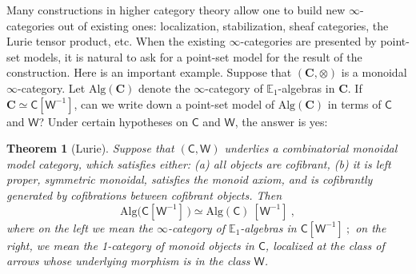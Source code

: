 \documentclass[a4paper,12pt]{amsart}
\theoremstyle{plain}
\newtheorem{theorem}{Theorem}[section]
\theoremstyle{definition}
\theoremstyle{remark}
\begin{document}
Many constructions in higher category theory allow one to build new $\infty$-categories out of existing ones: localization, stabilization, sheaf categories, the Lurie tensor product, etc. When the existing $\infty$-categories are presented by point-set models, it is natural to ask for a point-set model for the result of the construction. Here is an important example. Suppose that $(\mathbf C, \otimes)$ is a {monoidal} $\infty$-category. Let $\mathrm{Alg}(\mathbf C)$ denote the $\infty$-category of $\mathbb E_1$-algebras in $\mathbf C$. If $\mathbf C \simeq \mathsf C[\mathsf W^{-1}]$, can we write down a point-set model of $\mathrm{Alg}(\mathbf C)$ in terms of $\mathsf C$ and $\mathsf W$? Under certain hypotheses on $\mathsf C$ and $\mathsf W$, the answer is %
yes:

\begin{theorem}[Lurie] \label{lurie theorem} Suppose that $(\mathsf C,\mathsf W)$ underlies a combinatorial monoidal model category, which satisfies either: (a) all objects %
are cofibrant, (b) it is %
left proper, symmetric monoidal, satisfies the monoid axiom, and is cofibrantly generated by cofibrations between cofibrant objects. %
Then
	\begin{equation}
	    \label{eq: lurie equivalence}\mathrm{Alg}\big(\mathsf C[\mathsf W^{-1}]\, \big) \simeq \mathrm{Alg}(\mathsf C)~[\mathsf W^{-1}]~,
	\end{equation} 
	where %
on the left we mean the $\infty$-category of $\mathbb E_1$-algebras %
in $\mathsf C[\mathsf W^{-1}]~;$ on %
the right, we mean the 1-category of monoid objects in $\mathsf C$, localized at the class of arrows whose underlying morphism is in the class $\mathsf W$. 	
\end{theorem}
\end{document}
